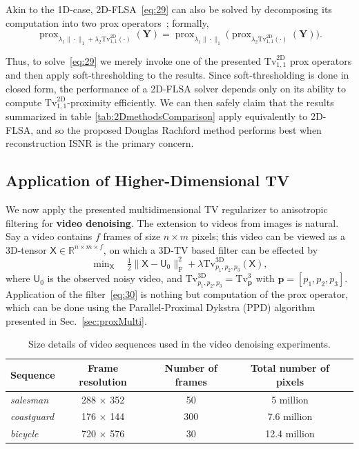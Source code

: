 \documentclass[twoside,11pt]{article}
\newcommand{\vp}{\bm{p}}       \newcommand{\vph}{\hat{\bm{p}}}        \newcommand{\ph}{\hat{p}}    \newcommand{\vpt}{\tilde{\bm{p}}}       \newcommand{\pt}{\tilde{p}}
\newcommand{\my}{\bm{Y}}
\newcommand{\tu}{\mathsf{U}}
\newcommand{\tx}{\mathsf{X}}
\newcommand{\mynorm}[2]{\| {#1} \|_{#2}}
\newcommand{\norm}[2]{\mynorm{#1}{#2}}
\newcommand{\frob}[1]{\|{#1}\|_{\text{F}}}
\DeclareMathOperator{\prox}{prox}
\def\abovestrut#1{\rule[0in]{0in}{#1}\ignorespaces}
\def\belowstrut#1{\rule[-#1]{0in}{#1}\ignorespaces}
\def\abovespace{\abovestrut{0.20in}}
\def\belowspace{\belowstrut{0.10in}}
\newcommand{\nlmin}{\min\nolimits}
\newcommand{\reals}{\mathbb{R}}
\newcommand{\half}{\tfrac{1}{2}}
\newcommand{\tvell}{\text{Tv}}
\newcommand{\twod}{\text{2D}}
\newcommand{\threed}{\text{3D}}
\numberwithin{equation}{section}
\numberwithin{theorem}{section}
\begin{document}
Akin to the 1D-case, 2D-FLSA~\eqref{eq:29} can also be solved %
by decomposing its computation into two prox operators~\citep{frHaHoTi07}; formally,
\begin{equation*}
 \prox_{\lambda_1 \norm{\cdot}{1} + \lambda_2 \tvell_{1,1}^{\twod}(\cdot)}(\my) = \prox_{\lambda_1 \norm{\cdot}{1}} \bigl( \prox_{\lambda_2 \tvell_{1,1}^{\twod}(\cdot)} (\my)\bigr).
\end{equation*}

Thus, to solve~\eqref{eq:29} we merely invoke one of the presented $\tvell_{1,1}^{\twod}$ prox operators and then apply soft-thresholding to the results. Since soft-thresholding is done in closed form, the performance of a 2D-FLSA solver depends only on its ability to compute $\tvell_{1,1}^{\twod}$-proximity efficiently. We can then safely claim that the results summarized in table \ref{tab:2DmethodsComparison} apply equivalently to 2D-FLSA, and so the proposed Douglas Rachford method performs best when reconstruction ISNR is the primary concern.

\subsection{Application of Higher-Dimensional TV}
\label{sec:appl.multi}
We now apply the presented multidimensional TV regularizer to anisotropic filtering for {\bf video denoising}. The extension to videos from images is natural. Say a video contains $f$ frames of size $n \times m$ pixels; this video can be viewed as a 3D-tensor $\tx \in \reals^{n \times m \times f}$, on which a 3D-TV based filter can be effected by
\begin{equation}
  \label{eq:30}
 \nlmin_{\tx} \quad \half\frob{\tx - \tu_0}^2 + \lambda \tvell_{p_1,p_2,p_3}^{\threed}(\tx),
\end{equation}
where $\tu_0$ is the observed noisy video, and $\tvell_{p_1,p_2,p_3}^{\threed} = \tvell^3_{\vp}$ with $\vp = [p_1, p_2, p_3]$. Application of the filter~\eqref{eq:30} is nothing but computation of the prox operator, which can be done using the Parallel-Proximal Dykstra (PPD) algorithm presented in Sec.~\ref{sec:proxMulti}.

\begin{table}
\begin{center}
\begin{tabular}{lcccc}
\hline
\abovespace\belowspace
      Sequence & Frame resolution & Number of frames & Total number of pixels \\
\hline
\abovespace
{\it salesman} & 288 $\times$ 352 & 50 & 5 million \\
{\it coastguard} & 176 $\times$ 144 & 300 & 7.6 million \\
\belowspace
{\it bicycle} & 720 $\times$ 576 & 30 & 12.4 million
\\ \hline
\end{tabular}
\end{center}
\caption{\small Size details of video sequences used in the video denoising experiments.
\label{tab:videoSequences}
}
\end{table}
\end{document}
